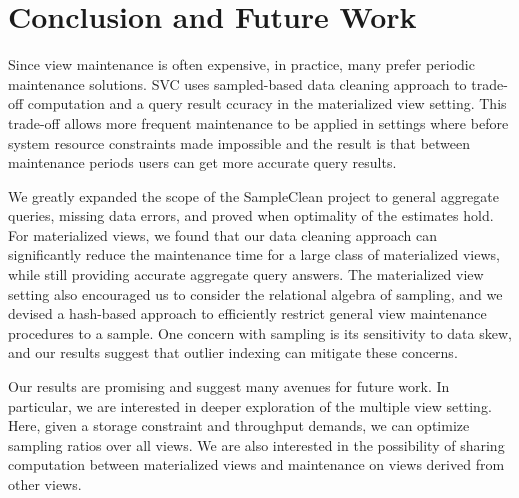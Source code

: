 \vspace{-1em}
\section{Conclusion and Future Work}\label{conclusion}
\vspace{-.3em}
Since view maintenance is often expensive, in practice, many prefer periodic maintenance solutions.
SVC uses sampled-based data cleaning approach to trade-off computation and a query result ccuracy in the materialized view setting.
This trade-off allows more frequent maintenance to be applied in settings where before system resource constraints made impossible and the result is that between maintenance periods users can get more accurate query results.

We greatly expanded the scope of the SampleClean project \cite{wang1999sample} to general aggregate queries, missing data errors, and proved when optimality of the estimates hold.
For materialized views, we found that our data cleaning approach can significantly reduce the maintenance time for a large class of materialized views, while still providing accurate aggregate query answers.
The materialized view setting also encouraged us to consider the relational algebra of sampling, and we devised a hash-based approach to efficiently restrict general view maintenance procedures to a sample.
One concern with sampling is its sensitivity to data skew, and our results suggest that outlier indexing can mitigate these concerns.

\iffalse
We evaluated our approach on real and synthetic datasets.
We use the TPCD benchmark to illustrate three common use cases of materialized views: joins, data-cube aggregates, and nested queries.
We also evaluated our approach on an industrial dataset from Conviva, where we demonstrated similar performance and accuracy.
We simulated a real deployment where we integrate SVC with periodic maintenance, and showed that SVC can exploit idle times in the system to give more accurate query results.
\fi

Our results are promising and suggest many avenues for future work.
In particular, we are interested in deeper exploration of the multiple view setting.
Here, given a storage constraint and throughput demands, we can optimize sampling ratios over all views.
We are also interested in the possibility of sharing computation between materialized views and maintenance on views derived from other views.




